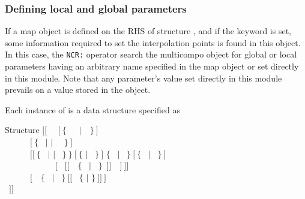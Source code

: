 \subsubsection{Defining local and global parameters}\label{sect:descintf}

\vskip -0.5cm

If a {\sc map} object is defined on the RHS of structure , and if the  keyword is set, some information required to set the interpolation points is found in this object. In this case, the {\tt NCR:} operator search the {\sc multicompo} object for global or local parameters  having an arbitrary name specified in the {\sc map} object or set directly in  this module. Note that any parameter's value set directly in this module prevails on a value stored in the  object.

Each instance of  is a data structure specified as

\begin{DataStructure}{Structure }
$[[$~ ~$[~\{$~~~$|$~~$\}~]$ \\
~~~~~~$[~\{$~ $|$  $|$ ~~$\}~]$ \\
~~~~~~$[[~\{$~ $|$  $|$ ~$\}~\}~[~\{$  $|$ ~$\}~]$  $\{$~ $|$ ~$\}~[~\{$~ $|$ ~$\}~]$ \\
~~~~~~~~~~~~$[$~ $[[$~~$\{$~ $|$ ~$\}$~$]]$~~$]~]]$  \\
~~~~~~$[$~~$\{$~ $|$ ~$\}~[[$~ $\{$  $|$ \moc{*} $\}~]]~]$ \\
~$]]$
\end{DataStructure}

